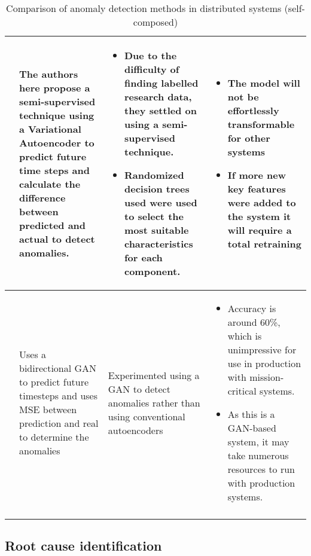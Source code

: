 \begin{longtable}{| p{20mm} | p{43mm} | p{43mm} | p{43mm} |}
  \cite{kumarage2018anomaly} &
  The authors here propose a semi-supervised technique using a Variational Autoencoder to predict future time steps and calculate the difference between predicted and actual to detect anomalies. &
  \vspace{-8mm}
  \begin{itemize}[leftmargin=*,noitemsep,nolistsep] 
    \item Due to the difficulty of finding labelled research data, they settled on using a semi-supervised technique.
    \item Randomized decision trees used were used to select the most suitable characteristics for each component.
  \vspace{-7mm}
  \end{itemize} &
  \vspace{-8mm}
  \begin{itemize}[leftmargin=*,noitemsep,nolistsep] 
    \item The model will not be effortlessly transformable for other systems
    \item If more new key features were added to the system it will require a total retraining
  \vspace{-7mm}
  \end{itemize} \\ \hline


  \cite{kumarage2019generative} &
  Uses a bidirectional GAN to predict future timesteps and uses MSE between prediction and real to determine the anomalies &
  Experimented using a GAN to detect anomalies rather than using conventional autoencoders &
  \vspace{-8mm}
  \begin{itemize}[leftmargin=*,noitemsep,nolistsep] 
    \item Accuracy is around 60\%, which is unimpressive for use in production with mission-critical systems.
    \item As this is a GAN-based system, it may take numerous resources to run with production systems.
  \vspace{-7mm}
  \end{itemize} \\ \hline


  \caption{Comparison of anomaly detection methods in distributed systems (self-composed)}
\end{longtable}

\subsection{Root cause identification}

